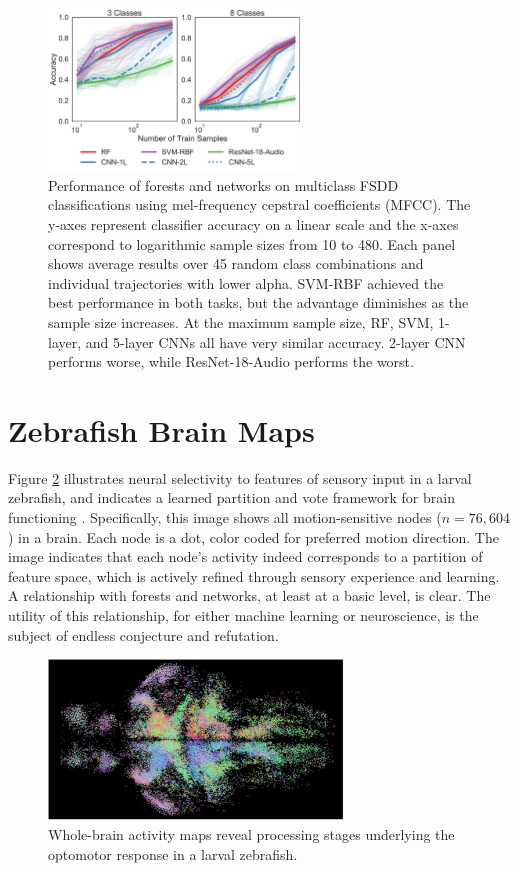 \begin{figure}[!htb]
\centering
\includegraphics[width=0.6\textwidth]{figures/mfcc.pdf}
  \caption{Performance of forests and networks on multiclass FSDD classifications using mel-frequency cepstral coefficients (MFCC). 
  The y-axes represent classifier accuracy on a linear scale and the x-axes correspond to logarithmic sample sizes from 10 to 480. Each panel shows average results over 45 random class combinations and individual trajectories with lower alpha.
  SVM-RBF achieved the best performance in both tasks, but the advantage diminishes as the sample size increases. At the maximum sample size, RF, SVM, 1-layer, and 5-layer CNNs all have very similar accuracy. 2-layer CNN performs worse, while ResNet-18-Audio performs the worst.
  }
\label{fig:mfcc}
\end{figure}
\clearpage

\section{Zebrafish Brain Maps}
\label{app:brains}
Figure \ref{fig:fluorian} illustrates neural selectivity to features of sensory input in a larval zebrafish, and indicates a learned partition and vote framework for brain functioning \citep{Naumann2016-oc}.
Specifically, this image shows all motion-sensitive nodes ($n = 76,604$) in a brain. Each node is a dot, color coded for preferred motion direction.
The image indicates that each node's activity indeed corresponds to a partition of feature space, which is actively refined through sensory experience and learning.
A relationship with forests and networks, at least at a basic level, is clear.
The utility of this relationship, for either machine learning or neuroscience, is the subject of endless conjecture and refutation.

\begin{figure}[h!]
\centering
\includegraphics[width=0.7\textwidth]{figures/fish.jpg}
  \caption{Whole-brain activity maps reveal processing stages underlying the optomotor response in a larval zebrafish.
  }
\label{fig:fluorian}
\end{figure}
\clearpage

